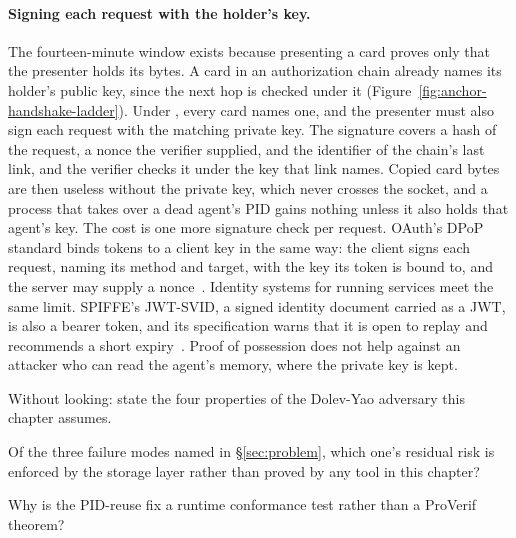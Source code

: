 \documentclass[11pt,a4paper]{article}
\theoremstyle{definition}
\begin{document}
\paragraph{Signing each request with the holder's key.}\label{sec:pop}
The fourteen-minute window exists because presenting a card proves only that
the presenter holds its bytes. A card in an authorization chain already names
its holder's public key, since the next hop is checked under it
(Figure~\ref{fig:anchor-handshake-ladder}). Under ,
every card names one, and the presenter must also sign each request with the
matching private key. The
signature covers a hash of the request, a nonce the verifier supplied, and the
identifier of the chain's last link, and the verifier checks it under the key
that link names. Copied card bytes are then useless without the private key,
which never crosses the socket, and a process that takes over a dead agent's
PID gains nothing unless it also holds that agent's key. The cost is one more
signature check per request. OAuth's DPoP standard binds tokens to a client
key in the same way: the client signs each request, naming its method and
target, with the key its token is bound to, and the server may supply a
nonce~. Identity systems for running services meet the
same limit. SPIFFE's JWT-SVID, a signed identity document carried as a JWT, is
also a bearer token, and its specification warns that it is open to replay and
recommends a short expiry~. Proof of possession does
not help against an attacker who can read the agent's memory, where the
private key is kept.






\pdexercisepointerone*{\ref{ex:anchor-security-envelope}}{\pageref{ex:anchor-security-envelope}}
\begin{pdrecitation}
\item Without looking: state the four properties of the Dolev-Yao adversary this chapter assumes.
\item Of the three failure modes named in \S\ref{sec:problem}, which one's residual risk is enforced by the storage layer rather than proved by any tool in this chapter?
\item Why is the PID-reuse fix a runtime conformance test rather than a ProVerif theorem?
\end{pdrecitation}
\end{document}
